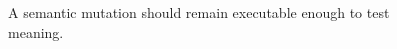 \begin{figure}[H]
\centering
{}
\caption{A semantic mutation should remain executable enough to test meaning.}\label{fig:teach-M07-06}
\end{figure}
